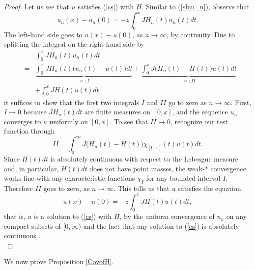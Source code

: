 \documentclass[preprint,12pt]{elsarticle}
\begin{document}
\begin{proof}
Let us see that $u$ satisfies (\ref{cs}) with $H$. Similar to (\ref{slnu_n}), observe that 
\begin{equation*}
u_n(x)-u_n(0)=-z\int_0^xJH_n(t)u_n(t)dt.
\end{equation*}
The left-hand side goes to $u(x)-u(0)$, as $n\to\infty$, by continuity. Due to splitting the integral on the right-hand side by  
\begin{eqnarray*}
&  & \int_0^xJH_n(t)u_n(t)dt \\
&=& \underbrace{ \int_0^xJH_n(t)\big(u_n(t)-u(t)\big)dt }_{=: I}
+\underbrace{\int_0^xJ\big( H_n(t)-H(t)\big)u(t)dt}_{=: II}\\
&  & +\int_0^xJH(t)u(t)dt
\end{eqnarray*}
it suffices to show that the first two integrals $I$ and $II$ go to zero as $n\to\infty$. First, $I\to 0$ because $JH_n(t)dt$ are finite measures on $[0,x]$, and the sequence $u_n$ converges to $u$ uniformly on $[0,x]$. To see that $II\to 0$, recognize our test function through  
\begin{equation*}
II=\int_0^{\infty}J\big( H_n(t)-H(t)\big)\chi_{[0,x]}(t)u(t)dt. 
\end{equation*}  
Since $H(t)dt$ is absolutely continuous with respect to the Lebesgue measure and, in particular, $H(t)dt$ does not have point masses, the weak-$*$ convergence works fine with any characteristic functions $\chi_{I}$ for any bounded interval $I$. Therefore $II$ goes to zero, as $n\to \infty$. This tells us that $u$ satisfies the equation 
\begin{equation*}
u(x)-u(0)=-z\int_0^xJH(t)u(t)dt, 
\end{equation*}
that is, $u$ is a solution to (\ref{cs}) with $H$, by the uniform convergence of $u_n$ on any compact subsets of $[0,\infty)$ and the fact that any solution to (\ref{cs}) is absolutely continuous \cite{KL,Win}.\\  
\end{proof}
We now prove Proposition \ref{CovofH}. 
\end{document}
